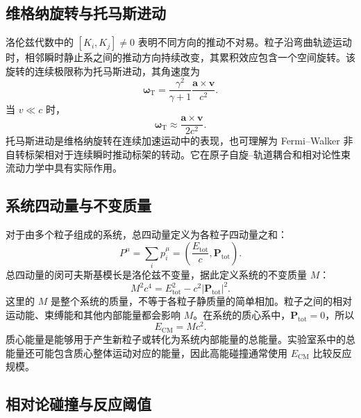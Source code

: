 \documentclass[style=classic,color=full]{lc-article}
\begin{document}
\subsection{维格纳旋转与托马斯进动}

洛伦兹代数中的 $[K_i,K_j]\neq0$ 表明不同方向的推动不对易。粒子沿弯曲轨迹运动时，相邻瞬时静止系之间的推动方向持续改变，其累积效应包含一个空间旋转。该旋转的连续极限称为托马斯进动，其角速度为
\begin{equation}
  \boxed{
  \bm\omega_{\mathrm T}
  =\frac{\gamma^2}{\gamma+1}
  \frac{\bm a\times\bm v}{c^2}.}
  \label{eq:thomasprecession}
\end{equation}
当 $v\ll c$ 时，
\begin{equation}
  \bm\omega_{\mathrm T}
  \approx\frac{\bm a\times\bm v}{2c^2}.
\end{equation}
托马斯进动是维格纳旋转在连续加速运动中的表现，也可理解为 Fermi--Walker 非自转标架相对于连续瞬时推动标架的转动。它在原子自旋--轨道耦合和相对论性束流动力学中具有实际作用\cite{rindler,weinberg1995}。

\subsection{系统四动量与不变质量}

对于由多个粒子组成的系统，总四动量定义为各粒子四动量之和：
\begin{equation}
  P^\mu=\sum_i p_i^\mu
  =\left(\frac{E_{\mathrm{tot}}}{c},\bm P_{\mathrm{tot}}\right).
  \label{eq:totalfourmomentum}
\end{equation}
总四动量的闵可夫斯基模长是洛伦兹不变量，据此定义系统的不变质量 $M$：
\begin{equation}
  \boxed{
  M^2c^4=E_{\mathrm{tot}}^2
  -c^2\lvert\bm P_{\mathrm{tot}}\rvert^2.}
  \label{eq:invariantmass}
\end{equation}
这里的 $M$ 是整个系统的质量，不等于各粒子静质量的简单相加。粒子之间的相对运动能、束缚能和其他内部能量都会影响 $M$。在系统的质心系中，$\bm P_{\mathrm{tot}}=0$，所以
\begin{equation}
  E_{\mathrm{CM}}=Mc^2.
  \label{eq:centerofmassenergy}
\end{equation}
质心能量是能够用于产生新粒子或转化为系统内部能量的总能量。实验室系中的总能量还可能包含质心整体运动对应的能量，因此高能碰撞通常使用 $E_{\mathrm{CM}}$ 比较反应规模。

\subsection{相对论碰撞与反应阈值}
\end{document}
